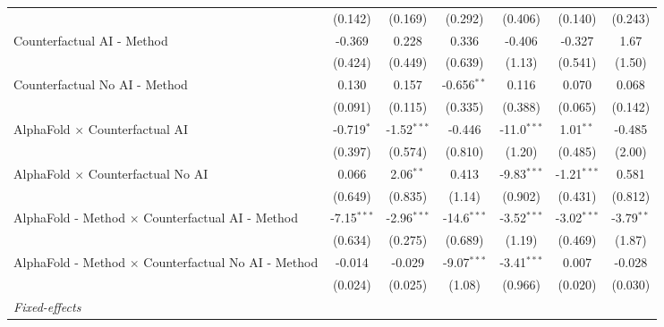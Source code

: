 \begin{tabular}{lcccccc}
                                                              & (0.142)        & (0.169)       & (0.292)       & (0.406)       & (0.140)       & (0.243)\\   
   Counterfactual AI - Method                                 & -0.369         & 0.228         & 0.336         & -0.406        & -0.327        & 1.67\\   
                                                              & (0.424)        & (0.449)       & (0.639)       & (1.13)        & (0.541)       & (1.50)\\   
   Counterfactual No AI - Method                              & 0.130          & 0.157         & -0.656$^{**}$ & 0.116         & 0.070         & 0.068\\   
                                                              & (0.091)        & (0.115)       & (0.335)       & (0.388)       & (0.065)       & (0.142)\\   
   AlphaFold $\times$ Counterfactual AI                       & -0.719$^{*}$   & -1.52$^{***}$ & -0.446        & -11.0$^{***}$ & 1.01$^{**}$   & -0.485\\   
                                                              & (0.397)        & (0.574)       & (0.810)       & (1.20)        & (0.485)       & (2.00)\\   
   AlphaFold $\times$ Counterfactual No AI                    & 0.066          & 2.06$^{**}$   & 0.413         & -9.83$^{***}$ & -1.21$^{***}$ & 0.581\\   
                                                              & (0.649)        & (0.835)       & (1.14)        & (0.902)       & (0.431)       & (0.812)\\   
   AlphaFold - Method $\times$ Counterfactual AI - Method     & -7.15$^{***}$  & -2.96$^{***}$ & -14.6$^{***}$ & -3.52$^{***}$ & -3.02$^{***}$ & -3.79$^{**}$\\   
                                                              & (0.634)        & (0.275)       & (0.689)       & (1.19)        & (0.469)       & (1.87)\\   
   AlphaFold - Method $\times$ Counterfactual No AI - Method  & -0.014         & -0.029        & -9.07$^{***}$ & -3.41$^{***}$ & 0.007         & -0.028\\   
                                                              & (0.024)        & (0.025)       & (1.08)        & (0.966)       & (0.020)       & (0.030)\\   
   \midrule
   \emph{Fixed-effects}\\

\end{tabular}
